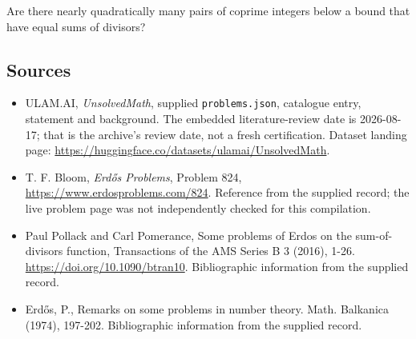 \documentclass[11pt,a4paper]{article}
\begin{document}
Are there nearly quadratically many pairs of coprime integers below a bound that have equal sums of divisors?

\subsection{Sources}

{\small

\begin{itemize}

\item[\hypertarget{source:statement:1}{S1}] ULAM.AI, \emph{UnsolvedMath}, supplied \texttt{problems.json}, catalogue entry, statement and background. The embedded literature-review date is 2026-08-17; that is the archive’s review date, not a fresh certification. Dataset landing page: \url{https://huggingface.co/datasets/ulamai/UnsolvedMath}.

\item[\hypertarget{source:statement:2}{S2}] T. F. Bloom, \emph{Erdős Problems}, Problem 824, \url{https://www.erdosproblems.com/824}. Reference from the supplied record; the live problem page was not independently checked for this compilation.

\item[\hypertarget{source:statement:3}{S3}] Paul Pollack and Carl Pomerance, Some problems of Erdos on the sum-of-divisors function, Transactions of the AMS Series B 3 (2016), 1-26. \url{https://doi.org/10.1090/btran10}. Bibliographic information from the supplied record.

\item[\hypertarget{source:statement:4}{S4}] Erd\H{o}s, P., Remarks on some problems in number theory. Math. Balkanica (1974), 197-202. Bibliographic information from the supplied record.

\end{itemize}

}

\label{end:statement}
\end{document}
